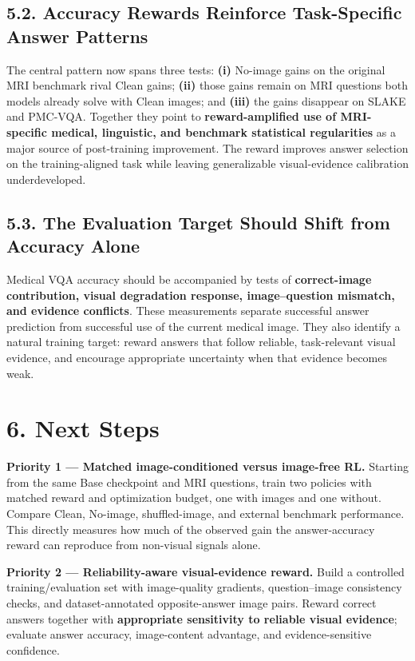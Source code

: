 \documentclass[
  10pt,
  a4paper,
]{article}
\begin{document}
\subsection{5.2. Accuracy Rewards Reinforce Task-Specific Answer
Patterns}\label{accuracy-rewards-reinforce-task-specific-answer-patterns}

The central pattern now spans three tests: \textbf{(i)} No-image gains
on the original MRI benchmark rival Clean gains; \textbf{(ii)} those
gains remain on MRI questions both models already solve with Clean
images; and \textbf{(iii)} the gains disappear on SLAKE and PMC-VQA.
Together they point to \textbf{reward-amplified use of MRI-specific
medical, linguistic, and benchmark statistical regularities} as a major
source of post-training improvement. The reward improves answer
selection on the training-aligned task while leaving generalizable
visual-evidence calibration underdeveloped.

\subsection{5.3. The Evaluation Target Should Shift from Accuracy
Alone}\label{the-evaluation-target-should-shift-from-accuracy-alone}

Medical VQA accuracy should be accompanied by tests of
\textbf{correct-image contribution, visual degradation response,
image--question mismatch, and evidence conflicts}. These measurements
separate successful answer prediction from successful use of the current
medical image. They also identify a natural training target: reward
answers that follow reliable, task-relevant visual evidence, and
encourage appropriate uncertainty when that evidence becomes weak.

\section{6. Next Steps}\label{next-steps}

\textbf{Priority 1 --- Matched image-conditioned versus image-free RL.}
Starting from the same Base checkpoint and MRI questions, train two
policies with matched reward and optimization budget, one with images
and one without. Compare Clean, No-image, shuffled-image, and external
benchmark performance. This directly measures how much of the observed
gain the answer-accuracy reward can reproduce from non-visual signals
alone.

\textbf{Priority 2 --- Reliability-aware visual-evidence reward.} Build
a controlled training/evaluation set with image-quality gradients,
question--image consistency checks, and dataset-annotated
opposite-answer image pairs. Reward correct answers together with
\textbf{appropriate sensitivity to reliable visual evidence}; evaluate
answer accuracy, image-content advantage, and evidence-sensitive
confidence.
\end{document}
